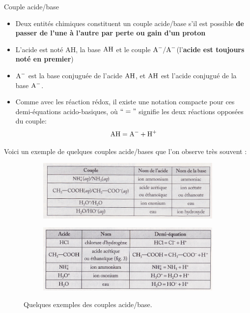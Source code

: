 \documentclass[11pt,a4paper]{article}
\begin{document}
\begin{defn}{Couple acide/base}
\begin{itemize}
    \item Deux entités chimiques constituent un couple acide/base s’il est possible \textbf{de passer de l’une à l’autre par perte ou gain d’un proton}
    \item L’acide est noté AH, la base $\ce{AH}$  et le couple $\ce{A-} / \ce{A-}$(l’\textbf{acide est toujours noté en premier})
    \item $\ce{A-}$ est la base conjuguée de l’acide $\ce{AH}$, et $\ce{AH}$ est l’acide conjugué de la base $\ce{A-}$.
    \item Comme avec les réaction rédox, il existe une notation compacte pour ces demi-équations acido-basiques, où $`` = "$ signifie les deux réactions opposées du couple: 
    $$\ce{AH} = \ce{A-} + \ce{H+} $$ 
\end{itemize}
\end{defn}

Voici un exemple de quelques couples acide/bases que l'on observe très souvent : 

\begin{figure}[ht]
\centering
\begin{subfigure}{.53\textwidth}
  \centering
  \includegraphics[width=\linewidth]{imgs/c3/tableAB.jpg}  
\end{subfigure}
\begin{subfigure}{.46\textwidth}
  \centering
  \includegraphics[width=\linewidth]{imgs/c3/tableACIDES.jpg}  
\end{subfigure}
\caption{Quelques exemples des couples acide/base.}
\end{figure}
\end{document}
